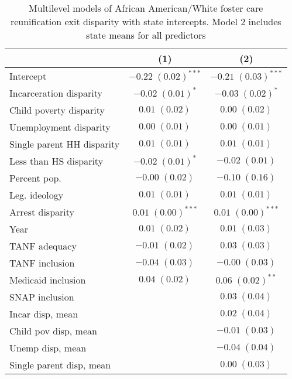 
\begin{table}
\caption{Multilevel models of African American/White foster care reunification exit disparity with state intercepts. Model 2 includes state means for all predictors }
\begin{center}
\begin{tabular}{l c c }
\hline
 & (1) & (2) \\
\hline
Intercept                  & $-0.22 \; (0.02)^{***}$ & $-0.21 \; (0.03)^{***}$ \\
Incarceration disparity    & $-0.02 \; (0.01)^{*}$   & $-0.03 \; (0.02)^{*}$   \\
Child poverty disparity    & $0.01 \; (0.02)$        & $0.00 \; (0.02)$        \\
Unemployment disparity     & $0.00 \; (0.01)$        & $0.00 \; (0.01)$        \\
Single parent HH disparity & $0.01 \; (0.01)$        & $0.01 \; (0.01)$        \\
Less than HS disparity     & $-0.02 \; (0.01)^{*}$   & $-0.02 \; (0.01)$       \\
Percent pop.               & $-0.00 \; (0.02)$       & $-0.10 \; (0.16)$       \\
Leg. ideology              & $0.01 \; (0.01)$        & $0.01 \; (0.01)$        \\
Arrest disparity           & $0.01 \; (0.00)^{***}$  & $0.01 \; (0.00)^{***}$  \\
Year                       & $0.01 \; (0.02)$        & $0.01 \; (0.03)$        \\
TANF adequacy              & $-0.01 \; (0.02)$       & $0.03 \; (0.03)$        \\
TANF inclusion             & $-0.04 \; (0.03)$       & $-0.00 \; (0.03)$       \\
Medicaid inclusion         & $0.04 \; (0.02)$        & $0.06 \; (0.02)^{**}$   \\
SNAP inclusion             &                         & $0.03 \; (0.04)$        \\
Incar disp, mean           &                         & $0.02 \; (0.04)$        \\
Child pov disp, mean       &                         & $-0.01 \; (0.03)$       \\
Unemp disp, mean           &                         & $-0.04 \; (0.04)$       \\
Single parent disp, mean   &                         & $0.00 \; (0.03)$        \\

\end{tabular}
\end{center}
\end{table}
